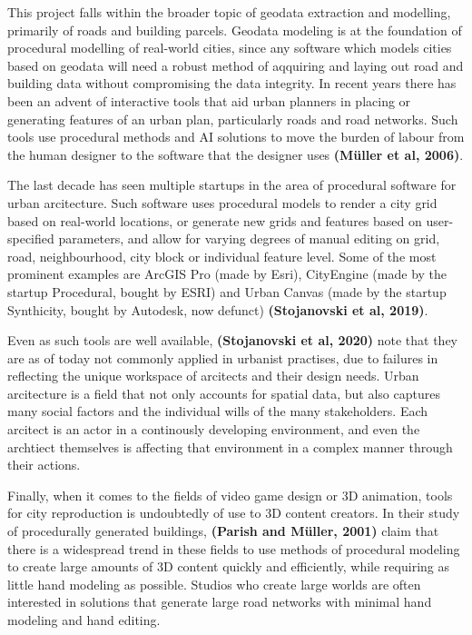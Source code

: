 \documentclass{kththesis}
\begin{document}
This project falls within the broader topic of geodata extraction and modelling, primarily of roads and building parcels.
Geodata modeling is at the foundation of procedural modelling of real-world cities, since any software which models cities based on geodata will need a robust method of aqquiring and laying out road and building data without compromising the data integrity.
In recent years there has been an advent of interactive tools that aid urban planners in placing or generating features of an urban plan, particularly roads and road networks.
Such tools use procedural methods and AI solutions to move the burden of labour from the human designer to the software that the designer uses
\textbf{(Müller et al, 2006)}.

The last decade has seen multiple startups in the area of procedural software for urban arcitecture.
Such software uses procedural models to render a city grid based on real-world locations, or generate new grids and features based on user-specified parameters, and allow for varying degrees of manual editing on grid, road, neighbourhood, city block or individual feature level.
Some of the most prominent examples are ArcGIS Pro (made by Esri), CityEngine (made by the startup Procedural, bought by ESRI) and Urban Canvas (made by the startup Synthicity, bought by Autodesk, now defunct) \textbf{(Stojanovski et al, 2019)}.

Even as such tools are well available, \textbf{(Stojanovski et al, 2020)} note that they are as of today not commonly applied in urbanist practises, due to failures in reflecting the unique workspace of arcitects and their design needs.
Urban arcitecture is a field that not only accounts for spatial data, but also captures many social factors and the individual wills of the many stakeholders.
Each arcitect is an actor in a continously developing environment, and even the archtiect themselves is affecting that environment in a complex manner through their actions.

Finally, when it comes to the fields of video game design or 3D animation, tools for city reproduction is undoubtedly of use to 3D content creators.
In their study of procedurally generated buildings, \textbf{(Parish and Müller, 2001)} claim that there is a widespread trend in these fields to use methods of procedural modeling to create large amounts of 3D content quickly and efficiently, while requiring as little hand modeling as possible.
Studios who create large worlds are often interested in solutions that generate large road networks with minimal hand modeling and hand editing.
\end{document}

